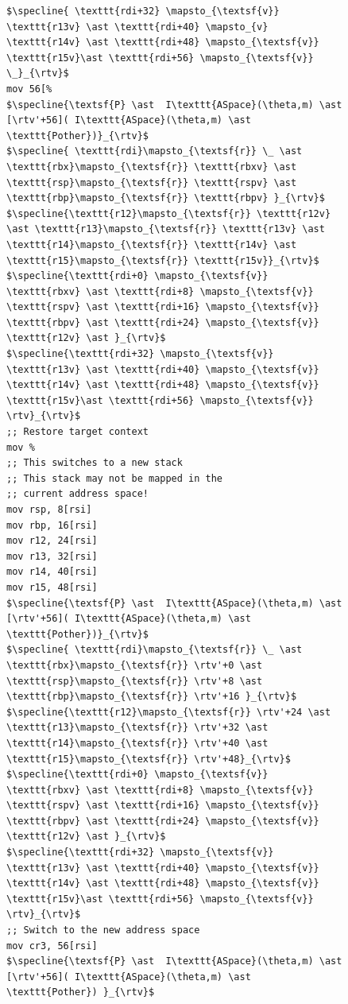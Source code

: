 \documentclass[acmsmall,screen,nonacm]{acmart}
\begin{document}
\begin{figure}
\begin{lstlisting}
$\specline{ \texttt{rdi+32} \mapsto_{\textsf{v}} \texttt{r13v} \ast \texttt{rdi+40} \mapsto_{v} \texttt{r14v} \ast \texttt{rdi+48} \mapsto_{\textsf{v}} \texttt{r15v}\ast \texttt{rdi+56} \mapsto_{\textsf{v}} \_}_{\rtv}$
mov 56[%
$\specline{\textsf{P} \ast  I\texttt{ASpace}(\theta,m) \ast [\rtv'+56]( I\texttt{ASpace}(\theta,m) \ast \texttt{Pother})}_{\rtv}$
$\specline{ \texttt{rdi}\mapsto_{\textsf{r}} \_ \ast \texttt{rbx}\mapsto_{\textsf{r}} \texttt{rbxv} \ast  \texttt{rsp}\mapsto_{\textsf{r}} \texttt{rspv} \ast \texttt{rbp}\mapsto_{\textsf{r}} \texttt{rbpv} }_{\rtv}$
$\specline{\texttt{r12}\mapsto_{\textsf{r}} \texttt{r12v} \ast \texttt{r13}\mapsto_{\textsf{r}} \texttt{r13v} \ast \texttt{r14}\mapsto_{\textsf{r}} \texttt{r14v} \ast \texttt{r15}\mapsto_{\textsf{r}} \texttt{r15v}}_{\rtv}$
$\specline{\texttt{rdi+0} \mapsto_{\textsf{v}} \texttt{rbxv} \ast \texttt{rdi+8} \mapsto_{\textsf{v}} \texttt{rspv} \ast \texttt{rdi+16} \mapsto_{\textsf{v}} \texttt{rbpv} \ast \texttt{rdi+24} \mapsto_{\textsf{v}} \texttt{r12v} \ast }_{\rtv}$
$\specline{\texttt{rdi+32} \mapsto_{\textsf{v}} \texttt{r13v} \ast \texttt{rdi+40} \mapsto_{\textsf{v}} \texttt{r14v} \ast \texttt{rdi+48} \mapsto_{\textsf{v}} \texttt{r15v}\ast \texttt{rdi+56} \mapsto_{\textsf{v}} \rtv}_{\rtv}$    
;; Restore target context
mov %
;; This switches to a new stack
;; This stack may not be mapped in the
;; current address space!
mov rsp, 8[rsi] 
mov rbp, 16[rsi]
mov r12, 24[rsi]
mov r13, 32[rsi]
mov r14, 40[rsi]
mov r15, 48[rsi]
$\specline{\textsf{P} \ast  I\texttt{ASpace}(\theta,m) \ast [\rtv'+56]( I\texttt{ASpace}(\theta,m) \ast \texttt{Pother})}_{\rtv}$
$\specline{ \texttt{rdi}\mapsto_{\textsf{r}} \_ \ast \texttt{rbx}\mapsto_{\textsf{r}} \rtv'+0 \ast  \texttt{rsp}\mapsto_{\textsf{r}} \rtv'+8 \ast \texttt{rbp}\mapsto_{\textsf{r}} \rtv'+16 }_{\rtv}$
$\specline{\texttt{r12}\mapsto_{\textsf{r}} \rtv'+24 \ast \texttt{r13}\mapsto_{\textsf{r}} \rtv'+32 \ast \texttt{r14}\mapsto_{\textsf{r}} \rtv'+40 \ast \texttt{r15}\mapsto_{\textsf{r}} \rtv'+48}_{\rtv}$
$\specline{\texttt{rdi+0} \mapsto_{\textsf{v}} \texttt{rbxv} \ast \texttt{rdi+8} \mapsto_{\textsf{v}} \texttt{rspv} \ast \texttt{rdi+16} \mapsto_{\textsf{v}} \texttt{rbpv} \ast \texttt{rdi+24} \mapsto_{\textsf{v}} \texttt{r12v} \ast }_{\rtv}$
$\specline{\texttt{rdi+32} \mapsto_{\textsf{v}} \texttt{r13v} \ast \texttt{rdi+40} \mapsto_{\textsf{v}} \texttt{r14v} \ast \texttt{rdi+48} \mapsto_{\textsf{v}} \texttt{r15v}\ast \texttt{rdi+56} \mapsto_{\textsf{v}} \rtv}_{\rtv}$
;; Switch to the new address space
mov cr3, 56[rsi]
$\specline{\textsf{P} \ast  I\texttt{ASpace}(\theta,m) \ast [\rtv'+56]( I\texttt{ASpace}(\theta,m) \ast \texttt{Pother}) }_{\rtv}$

\end{lstlisting}
\end{figure}
\end{document}
